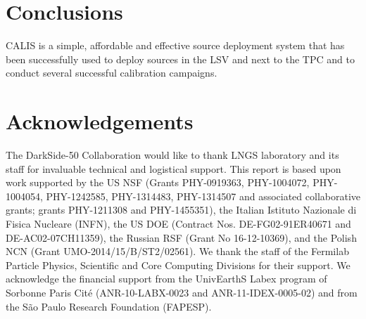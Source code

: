 \section{Conclusions}\label{sec:Conclusions}\label{sec:Conclusion}
CALIS is a simple, affordable and effective source deployment system that has been successfully used to deploy sources in the LSV and next to the TPC and to conduct several successful calibration campaigns.%



\section{Acknowledgements}\label{sec:Acknowledgements}
The DarkSide-50 Collaboration would like to thank LNGS laboratory and its staff for invaluable technical and logistical support. This report is based upon work supported by the US NSF (Grants PHY-0919363, PHY-1004072, PHY-1004054, PHY-1242585, PHY-1314483, PHY-1314507 and associated collaborative grants; grants PHY-1211308 and PHY-1455351), the Italian Istituto Nazionale di Fisica Nucleare (INFN), the US DOE (Contract Nos. DE-FG02-91ER40671 and DE-AC02-07CH11359), the Russian RSF (Grant No 16-12-10369), and the Polish NCN (Grant UMO-2014/15/B/ST2/02561). %
We thank the staff of the Fermilab Particle Physics, Scientific and Core Computing Divisions for their support. We acknowledge the financial support from the UnivEarthS Labex program of Sorbonne Paris Cit\'{e} (ANR-10-LABX-0023 and ANR-11-IDEX-0005-02) and from the S\~{a}o Paulo Research Foundation (FAPESP).